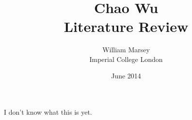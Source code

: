 \documentclass[a4paper,11pt,twoside,notitlepage]{report}
\renewenvironment{abstract}
 {
	\small
  	\begin{center}
  	\bfseries \abstractname\vspace{-.5em}\vspace{0pt}
  	\end{center}
  	\list{}{
    	\setlength{\leftmargin}{.5cm}%
    	\setlength{\rightmargin}{\leftmargin}%
  	}%
  	\item\relax}
 	{\endlist}
\begin{document}
	\title{Chao Wu
		\\ \small Literature Review}
	\author{William Marsey
		\\Imperial College London}
	\date{June 2014}
 	\maketitle
	

	\begin{framed}
		\begin{abstract}
	
		I don't know what this is yet.
	
%

		\end{abstract}
	\end{framed}
\end{document}
